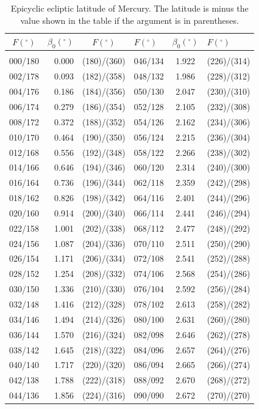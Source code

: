 \clearpage
\begin{table}[!h]\centering
\vspace{0.25cm}
{ \begin{tabular}{crc|lcl}
$F (^\circ)$ & $\beta_0(^\circ)$ &$F (^\circ)$ & $F (^\circ)$ & $\beta_0(^\circ)$ &$F (^\circ)$\\\hline
&&\\[-1.75ex]
000/180 &  0.000 & (180)/(360)&046/134 &  1.922 & (226)/(314)\\
002/178 &  0.093 & (182)/(358)&048/132 &  1.986 & (228)/(312)\\
004/176 &  0.186 & (184)/(356)&050/130 &  2.047 & (230)/(310)\\
006/174 &  0.279 & (186)/(354)&052/128 &  2.105 & (232)/(308)\\
008/172 &  0.372 & (188)/(352)&054/126 &  2.162 & (234)/(306)\\
010/170 &  0.464 & (190)/(350)&056/124 &  2.215 & (236)/(304)\\
012/168 &  0.556 & (192)/(348)&058/122 &  2.266 & (238)/(302)\\
014/166 &  0.646 & (194)/(346)&060/120 &  2.314 & (240)/(300)\\
016/164 &  0.736 & (196)/(344)&062/118 &  2.359 & (242)/(298)\\
018/162 &  0.826 & (198)/(342)&064/116 &  2.401 & (244)/(296)\\
020/160 &  0.914 & (200)/(340)&066/114 &  2.441 & (246)/(294)\\
022/158 &  1.001 & (202)/(338)&068/112 &  2.477 & (248)/(292)\\
024/156 &  1.087 & (204)/(336)&070/110 &  2.511 & (250)/(290)\\
026/154 &  1.171 & (206)/(334)&072/108 &  2.541 & (252)/(288)\\
028/152 &  1.254 & (208)/(332)&074/106 &  2.568 & (254)/(286)\\
030/150 &  1.336 & (210)/(330)&076/104 &  2.592 & (256)/(284)\\
032/148 &  1.416 & (212)/(328)&078/102 &  2.613 & (258)/(282)\\
034/146 &  1.494 & (214)/(326)&080/100 &  2.631 & (260)/(280)\\
036/144 &  1.570 & (216)/(324)&082/098 &  2.646 & (262)/(278)\\
038/142 &  1.645 & (218)/(322)&084/096 &  2.657 & (264)/(276)\\
040/140 &  1.717 & (220)/(320)&086/094 &  2.665 & (266)/(274)\\
042/138 &  1.788 & (222)/(318)&088/092 &  2.670 & (268)/(272)\\
044/136 &  1.856 & (224)/(316)&090/090 &  2.672 & (270)/(270)\\
\end{tabular}}
\caption{Epicyclic  ecliptic latitude of Mercury.  The latitude is minus the value shown
in the table if the argument is
in parentheses. }\label{tlat1mc}
\end{table}

